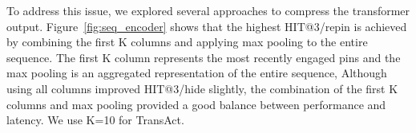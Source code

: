 To address this issue, we explored several approaches to compress the transformer output.
Figure~\ref{fig:seq_encoder} shows that the highest HIT@3/repin is achieved by combining the first K columns and applying max pooling to the entire sequence. 
The first K column represents the most recently engaged pins and the max pooling is an aggregated representation of the entire sequence,
Although using all columns improved HIT@3/hide slightly, the combination of the first K columns and max pooling provided a good balance between performance and latency. We use K=10 for TransAct.



